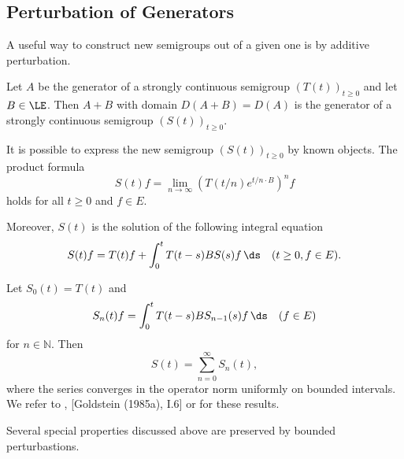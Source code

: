 \subsection{Perturbation of Generators} \label{subsec:a2-1.se8}
A useful way to construct new semigroups out of a given one is by additive perturbation.

\begin{theorem}\label{thm:a2-1.29}
Let $A$ be the generator of a strongly continuous semigroup $(T(t))_{t \geq 0}$ and let $B \in \LE$.
Then $A + B$ with domain $D(A+B) = D(A)$ is the generator of a strongly continuous semigroup $(S(t))_{t \geq 0}$.
\end{theorem}

It is possible to express the new semigroup $(S(t))_{t \geq 0}$ by known objects.
The product formula
\begin{equation}\label{eq:a2-1.8}
    S(t)f = \lim_{n \to \infty} (T(t/n)e^{t/n \cdot B})^{n}f
\end{equation}
holds for all $t \geq 0$ and $f \in E$.

Moreover, $S(t)$ is the solution of the following integral equation
\begin{equation}\label{eq:a2-1.9}
    S(t)f = T(t)f + \int_{0}^{t} T(t-s)BS(s)f\, \ds \quad (t \geq 0, f \in E).
\end{equation}

Let $S_{0}(t) = T(t)$ and
\begin{equation}\label{eq:a2-1.10}
    S_{n}(t)f = \int_{0}^{t} T(t-s)BS_{n-1}(s)f\, \ds \quad (f \in E)
\end{equation}
for $n \in \mathbb{N}$. Then
\begin{equation}\label{eq:a2-1.11}
    S(t) = \sum_{n=0}^{\infty} S_{n}(t),
\end{equation}
where the series converges in the operator norm uniformly on bounded intervals.
We refer to \citet[III.1]{davies:1980}, [Goldstein (1985a), I.6] or \citet[Chap.3]{pazy:1983} for these results.

Several special properties discussed above are preserved by bounded perturbastions.

